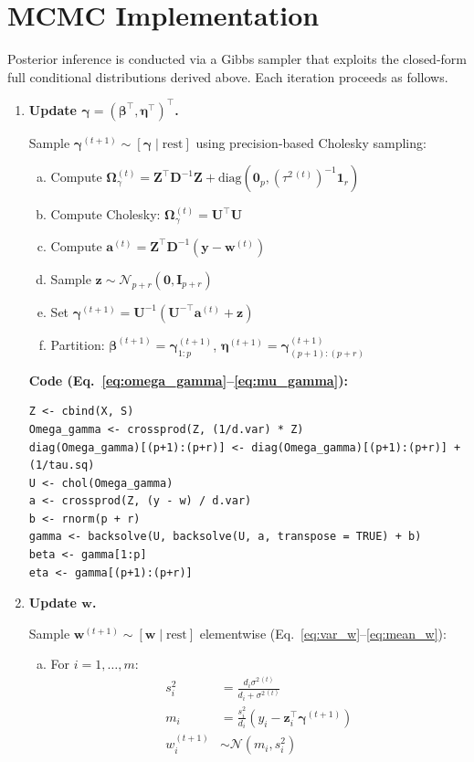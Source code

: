\documentclass[12pt]{article}
\begin{document}
\section{MCMC Implementation}

Posterior inference is conducted via a Gibbs sampler that exploits the closed-form
full conditional distributions derived above. Each iteration proceeds as follows.

\begin{enumerate}
  \item \textbf{Update $\boldsymbol{\gamma} = (\boldsymbol{\beta}^\top, \boldsymbol{\eta}^\top)^\top$.}

  Sample $\boldsymbol{\gamma}^{(t+1)} \sim [\boldsymbol{\gamma} \mid \text{rest}]$ using precision-based Cholesky sampling:
  \begin{enumerate}[(a)]
    \item Compute $\boldsymbol{\Omega}_\gamma^{(t)} = \mathbf{Z}^\top \mathbf{D}^{-1} \mathbf{Z} + \mathrm{diag}(\mathbf{0}_p, (\tau^{2\,(t)})^{-1}\mathbf{1}_r)$
    \item Compute Cholesky: $\boldsymbol{\Omega}_\gamma^{(t)} = \mathbf{U}^\top\mathbf{U}$
    \item Compute $\mathbf{a}^{(t)} = \mathbf{Z}^\top \mathbf{D}^{-1}(\mathbf{y} - \mathbf{w}^{(t)})$
    \item Sample $\mathbf{z} \sim \mathcal{N}_{p+r}(\mathbf{0}, \mathbf{I}_{p+r})$
    \item Set $\boldsymbol{\gamma}^{(t+1)} = \mathbf{U}^{-1}(\mathbf{U}^{-\top}\mathbf{a}^{(t)} + \mathbf{z})$
    \item Partition: $\boldsymbol{\beta}^{(t+1)} = \boldsymbol{\gamma}^{(t+1)}_{1:p}$, $\boldsymbol{\eta}^{(t+1)} = \boldsymbol{\gamma}^{(t+1)}_{(p+1):(p+r)}$
  \end{enumerate}

  \textbf{Code (Eq.~\ref{eq:omega_gamma}--\ref{eq:mu_gamma}):}
\begin{verbatim}
Z <- cbind(X, S)
Omega_gamma <- crossprod(Z, (1/d.var) * Z)
diag(Omega_gamma)[(p+1):(p+r)] <- diag(Omega_gamma)[(p+1):(p+r)] + (1/tau.sq)
U <- chol(Omega_gamma)
a <- crossprod(Z, (y - w) / d.var)
b <- rnorm(p + r)
gamma <- backsolve(U, backsolve(U, a, transpose = TRUE) + b)
beta <- gamma[1:p]
eta <- gamma[(p+1):(p+r)]
\end{verbatim}

  \item \textbf{Update $\mathbf{w}$.}

  Sample $\mathbf{w}^{(t+1)} \sim [\mathbf{w} \mid \text{rest}]$ elementwise (Eq.~\ref{eq:var_w}--\ref{eq:mean_w}):
  \begin{enumerate}[(a)]
    \item For $i = 1, \ldots, m$:
    \begin{align*}
      s_i^2 &= \frac{d_i \sigma^{2\,(t)}}{d_i + \sigma^{2\,(t)}} \\
      m_i &= \frac{s_i^2}{d_i} (y_i - \mathbf{z}_i^\top \boldsymbol{\gamma}^{(t+1)}) \\
      w_i^{(t+1)} &\sim \mathcal{N}(m_i, s_i^2)
    \end{align*}
  \end{enumerate}


\end{enumerate}
\end{document}

